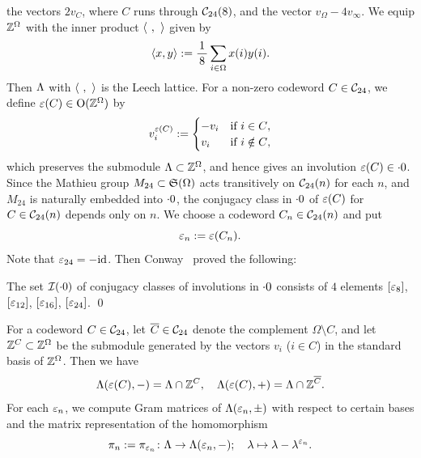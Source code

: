 \documentclass{amsart} %
\begin{document}
the vectors $2v_C$,
where $C$ runs through $\mathord{\mathcal{C}}_{24}(8)$, and 
the vector $v_{\Omega}-4v_{\infty}$.
%
%
We equip $\mathord{\mathbb{Z}}^{\Omega}$ with the inner product $\langle \phantom{i}, \phantom{i} \rangle$ 
given by
\[
\langle x, y \rangle:=\frac{1}{\,8\,} \sum_{i\in\Omega} x(i) y(i).
\]
Then $\Lambda$ with $\langle \phantom{i}, \phantom{i} \rangle$ is the Leech lattice.
For a  non-zero codeword $C\in \mathord{\mathcal{C}}_{24}$,
we define $\varepsilon(C)\in \mathord{\mathrm{O}}(\mathord{\mathbb{Z}}^{\Omega})$ by 
\[
v_i^{\varepsilon(C)}:=
\begin{cases}
-v_i & \textrm{if $i\in C$}, \\
v_i& \textrm{if $i\notin C$},
\end{cases}
\]
which  preserves the submodule $\Lambda\subset \mathord{\mathbb{Z}}^{\Omega}$,  and hence gives 
an involution $\varepsilon(C)\in \cdot 0$. %
Since the Mathieu group $M_{24}\subset \mathord{\mathfrak{S}}(\Omega)$ acts transitively
on $\mathord{\mathcal{C}}_{24}(n)$ for each $n$, 
and $M_{24}$ is naturally embedded into $\cdot 0$,
the conjugacy class in $\cdot 0$ of  $\varepsilon(C)$ for $C\in \mathord{\mathcal{C}}_{24}(n)$ 
depends only on $n$.
We choose a codeword $C_n\in \mathord{\mathcal{C}}_{24}(n)$  and put
\[
\varepsilon_n:=\varepsilon(C_n).
\]
Note that $\varepsilon_{24}=-\mathord{\mathrm{id}}$.
Then Conway~\cite[Chapter 10, Section 3.7]{theCSbook} proved  the following:
%
\begin{theorem}[Conway]
The set  $\mathord{\mathcal{I}}(\cdot 0)$ of conjugacy classes of involutions in $\cdot 0$ 
consists of $4$ elements $[\varepsilon_8]$, $[\varepsilon_{12}]$, $[\varepsilon_{16}]$, $[\varepsilon_{24}]$.
\qed
\end{theorem}
%
%
%
For a codeword $C\in \mathord{\mathcal{C}}_{24}$,
let $\overline{C}\in \mathord{\mathcal{C}}_{24}$ denote the complement $\Omega\setminus C$,
and let 
$\mathord{\mathbb{Z}}^{C}\subset \mathord{\mathbb{Z}}^{\Omega}$ be 
the submodule generated by the vectors $v_i$ ($i\in C$)
in the standard basis of $\mathord{\mathbb{Z}}^{\Omega}$.
Then we have
%
\begin{equation}\label{eq:Leechveppm}
\Lambda(\varepsilon(C), -)=\Lambda\cap \mathord{\mathbb{Z}}^{C},
\quad
\Lambda(\varepsilon(C), +)=\Lambda\cap \mathord{\mathbb{Z}}^{\overline{C}}.
\end{equation}
%
For each $\varepsilon_n$,
we compute  Gram matrices of $\Lambda(\varepsilon_n, \pm)$ 
with respect to  certain bases
and  the matrix representation of the homomorphism 
\[
\pi_n:=\pi_{\varepsilon_n}\colon \Lambda \to \Lambda(\varepsilon_n, -); \quad \lambda\mapsto \lambda-\lambda^{\varepsilon_n}.
\]
\end{document}
